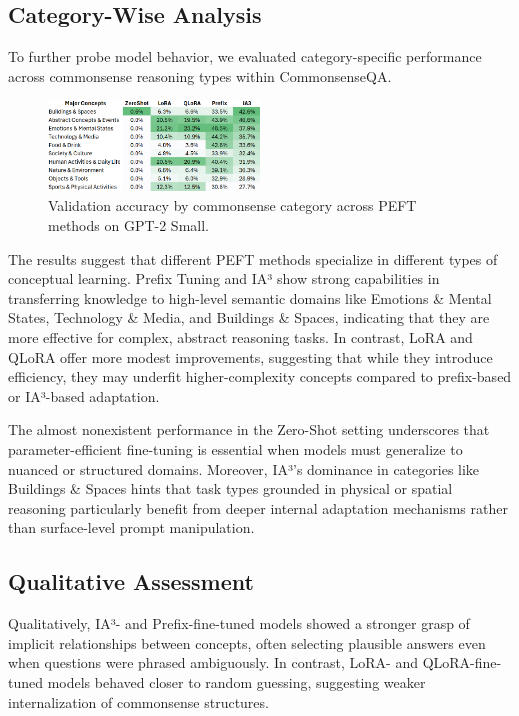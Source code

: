 \documentclass[11pt,twocolumn]{article}
\begin{document}
\subsection{Category-Wise Analysis}

To further probe model behavior, we evaluated category-specific performance across commonsense reasoning types within CommonsenseQA.

\begin{figure}[h]
\centering
\includegraphics[width=0.5\textwidth]{../graphs/Categorical_Performance.png}
\caption{Validation accuracy by commonsense category across PEFT methods on GPT-2 Small.}
\label{fig:category-accuracy}
\end{figure}

The results suggest that different PEFT methods specialize in different types of conceptual learning.
Prefix Tuning and IA³ show strong capabilities in transferring knowledge to high-level semantic domains like Emotions \& Mental States, Technology \& Media, and Buildings \& Spaces, indicating that they are more effective for complex, abstract reasoning tasks.
In contrast, LoRA and QLoRA offer more modest improvements, suggesting that while they introduce efficiency, they may underfit higher-complexity concepts compared to prefix-based or IA³-based adaptation.

The almost nonexistent performance in the Zero-Shot setting underscores that parameter-efficient fine-tuning is essential when models must generalize to nuanced or structured domains.
Moreover, IA³’s dominance in categories like Buildings \& Spaces hints that task types grounded in physical or spatial reasoning particularly benefit from deeper internal adaptation mechanisms rather than surface-level prompt manipulation.


\subsection{Qualitative Assessment}

Qualitatively, IA³- and Prefix-fine-tuned models showed a stronger grasp of implicit relationships between concepts, often selecting plausible answers even when questions were phrased ambiguously. In contrast, LoRA- and QLoRA-fine-tuned models behaved closer to random guessing, suggesting weaker internalization of commonsense structures.
\end{document}
